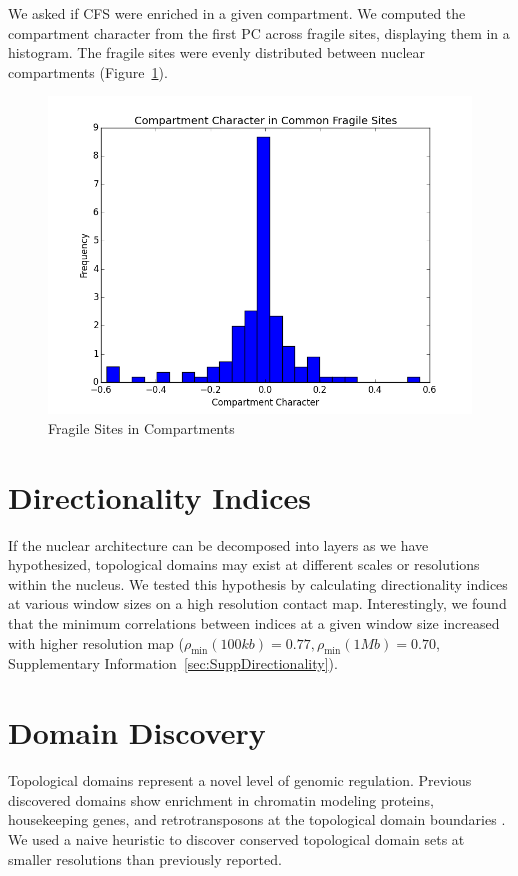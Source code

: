 We asked if \gls{CFS} were enriched in a given compartment.  We computed the compartment character from the first \gls{PC} across fragile
sites, displaying them in a histogram.  The fragile sites were evenly distributed between nuclear compartments (Figure~\ref{fig:compartmentCFS}).

\begin{figure}[thp]
  \centering
  \caption{Fragile Sites in Compartments}\label{fig:compartmentCFS}
  \includegraphics[width=\textwidth]{./figures/results/cfs.png}
\end{figure}

\section*{Directionality Indices}

If the nuclear architecture can be decomposed into layers as we have hypothesized, topological domains may exist at different
scales or resolutions within the nucleus.  We tested this hypothesis by calculating directionality indices at various window sizes
on a high resolution contact map.  Interestingly, we found that the minimum correlations between indices at a given window size increased
with higher resolution map ($\rho_{\min}(100kb) = 0.77, \rho_{\min}(1Mb) = 0.70$, Supplementary Information~\ref{sec:SuppDirectionality}).

\section*{Domain Discovery}

Topological domains represent a novel level of genomic regulation.  Previous discovered domains show enrichment in chromatin modeling proteins,
housekeeping genes, and retrotransposons at the topological domain boundaries \citep{dixon2012}.  We used a naive heuristic to discover conserved
topological domain sets at smaller resolutions than previously reported.

